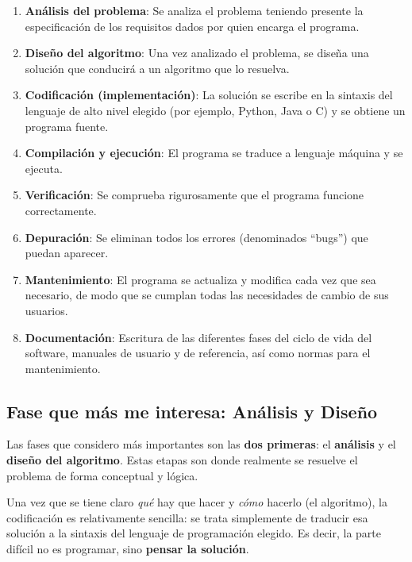 \documentclass[12pt]{article}
\begin{document}
\begin{enumerate}
    \item \textbf{Análisis del problema}: Se analiza el problema teniendo presente la especificación de los requisitos dados por quien encarga el programa.
    
    \item \textbf{Diseño del algoritmo}: Una vez analizado el problema, se diseña una solución que conducirá a un algoritmo que lo resuelva.
    
    \item \textbf{Codificación (implementación)}: La solución se escribe en la sintaxis del lenguaje de alto nivel elegido (por ejemplo, Python, Java o C) y se obtiene un programa fuente.
    
    \item \textbf{Compilación y ejecución}: El programa se traduce a lenguaje máquina y se ejecuta.
    
    \item \textbf{Verificación}: Se comprueba rigurosamente que el programa funcione correctamente.
    
    \item \textbf{Depuración}: Se eliminan todos los errores (denominados ``bugs'') que puedan aparecer.
    
    \item \textbf{Mantenimiento}: El programa se actualiza y modifica cada vez que sea necesario, de modo que se cumplan todas las necesidades de cambio de sus usuarios.
    
    \item \textbf{Documentación}: Escritura de las diferentes fases del ciclo de vida del software, manuales de usuario y de referencia, así como normas para el mantenimiento.
\end{enumerate}

\subsection{Fase que más me interesa: Análisis y Diseño}

Las fases que considero más importantes son las \textbf{dos primeras}: el \textbf{análisis} y el \textbf{diseño del algoritmo}. Estas etapas son donde realmente se resuelve el problema de forma conceptual y lógica.

Una vez que se tiene claro \textit{qué} hay que hacer y \textit{cómo} hacerlo (el algoritmo), la codificación es relativamente sencilla: se trata simplemente de traducir esa solución a la sintaxis del lenguaje de programación elegido. Es decir, la parte difícil no es programar, sino \textbf{pensar la solución}.
\end{document}
